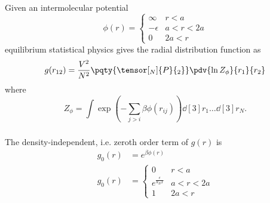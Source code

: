 \documentclass[12pt]{article}
\begin{document}
     \subsection{} Given an intermolecular potential \[
        \phi(r) = \begin{cases}
            \infty &r < a\\
            - \epsilon &a < r < 2a\\
            0& 2a < r
        \end{cases}
    \]
    equilibrium statistical physics gives the radial distribution function as \[
        g(r_{12}) = \frac{V^2}{N^2} \pqty{\tensor[_N]{P}{_2}} \pdv{\ln Z_\phi}{r_1}{r_2}
    \]
    where \[
        Z_\phi = \int \exp( - \sum_{j > i} \beta \phi(r_{ij}))  \dd[3]{r_1} \dots \dd[3]{r_N}.
    \]
     \subsubsection{} The density-independent, i.e. zeroth order term of \(g(r)\) is \begin{align*}
        g_0(r) &= e^{\beta \phi(r)}\\
        g_0(r) &= \begin{cases}
            0 & r < a\\
            e^{\frac{\epsilon}{k_BT}} & a < r < 2a\\
            1 & 2a < r
        \end{cases}
    \end{align*}
    \begin{figure}[H]
        \centering
    \end{figure}
\end{document}

